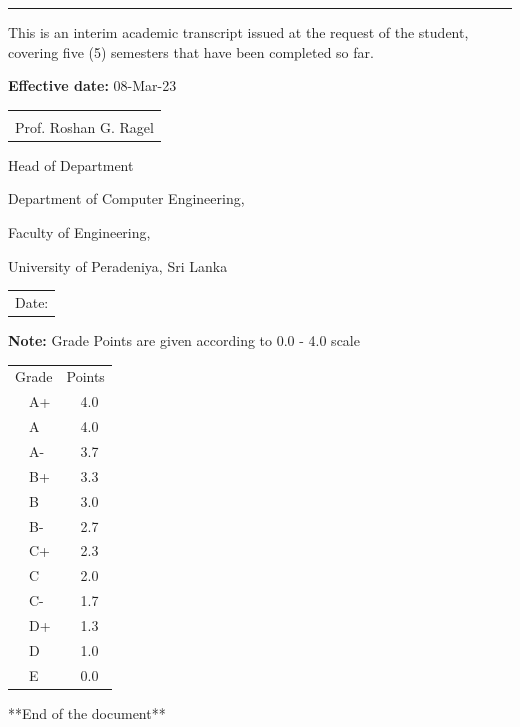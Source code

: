 \documentclass[12pt]{article}
\makeatletter
\newcommand{\sign}[1]{%
  \begin{tabular}[t]{@{}l@{}}
  \makebox[2.5in]{\dotfill}\\
  \strut#1\strut
  \end{tabular}%
}
\newcommand{\Date}{%
  \begin{tabular}[t]{@{}p{2.5in}@{}}
  \\[-2ex]
  \strut Date: \dotfill\strut
  \end{tabular}%
}
\makeatother
\begin{document}
\noindent\rule{\textwidth}{1pt}
\vspace{5pt}
This is an interim academic transcript issued at the request of the student, covering five (5) semesters that have been completed so far.
\vspace{5pt}

\noindent\textbf{Effective date:} 08-Mar-23

\vspace{45pt}

\noindent
\begin{minipage}[t]{0.5\linewidth}
    \raggedright
    \sign{Prof. Roshan G. Ragel}
    \par
    Head of Department\par
    Department of Computer Engineering, \par
    Faculty of Engineering, \par
    University of Peradeniya, Sri Lanka
\end{minipage}%
\hfill
  \begin{minipage}[t]{0.4\linewidth}
    \Date
  \end{minipage}


\newpage
\textbf{Note:} Grade Points are given according to 0.0 - 4.0 scale

\begin{table}[H]
\centering
\begin{tabular}{ll}
\multicolumn{1}{c}{Grade} &
\multicolumn{1}{c}{Points}\\
\ \ A+    & \ \ 4.0    \\ 
\ \ A     & \ \ 4.0    \\ 
\ \ A-    & \ \ 3.7    \\ 
\ \ B+    & \ \ 3.3    \\ 
\ \ B    & \ \ 3.0    \\ 
\ \ B-    & \ \ 2.7    \\ 
\ \ C+    & \ \ 2.3    \\ 
\ \ C     & \ \ 2.0    \\ 
\ \ C-    & \ \ 1.7    \\ 
\ \ D+    & \ \ 1.3    \\ 
\ \ D     & \ \ 1.0    \\ 
\ \ E     & \ \ 0.0    \\ 
\end{tabular}
\end{table}

\begin{center}
**End of the document**
\end{center}
\end{document}
